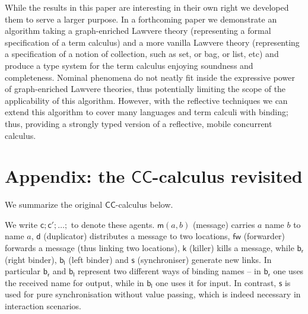 \documentclass[submission,copyright,creativecommons]{eptcs}
\newcommand{\new}{\mathsf{new}}
\newcommand{\ccomb}{$\mathsf{CC}$-calculus}
\newcommand{\bc}{\mathbin{\mathbf{::=}}}
\newcommand{\bm}{\mathbin{\mathbf\mid}}
\theoremstyle{definition}
\theoremstyle{remark}
\theoremstyle{remark}
\begin{document}
While the results in this paper are
interesting in their own right we developed them to serve a larger
purpose. In a forthcoming paper we demonstrate an algorithm taking a
graph-enriched Lawvere theory (representing a formal specification of
a term calculus) and a more vanilla Lawvere theory (representing a
specification of a notion of collection, such as set, or bag, or list,
etc) and produce a type system for the term calculus enjoying
soundness and completeness. Nominal phenomena do not neatly fit inside
the expressive power of graph-enriched Lawvere theories, thus
potentially limiting the scope of the applicability of this
algorithm. However, with the reflective techniques we can extend this
algorithm to cover many languages and term calculi with binding; thus,
providing a strongly typed version of a reflective, mobile concurrent
calculus.




\section{Appendix: the {\ccomb} revisited} \label{appendix:ccomb}
We summarize the original {\ccomb} \cite{DBLP:journals/tcs/Yoshida02} below.


We write $\mathsf{c};\mathsf{c'};\ldots;$ to denote these
agents. $\mathsf{m}(a,b)$ (message) carries $a$ name $b$ to name $a$,
$\mathsf{d}$ (duplicator) distributes a message to two locations,
$\mathsf{fw}$ (forwarder) forwards a message (thus linking two
locations), $\mathsf{k}$ (killer) kills a message, while
$\mathsf{b}_{\mathsf{r}}$ (right binder), $\mathsf{b}_{\mathsf{l}}$
(left binder) and $\mathsf{s}$ (synchroniser) generate new links. In
particular $\mathsf{b}_{\mathsf{r}}$ and $\mathsf{b}_{\mathsf{l}}$
represent two different ways of binding names – in
$\mathsf{b}_{\mathsf{r}}$ one uses the received name for output, while
in $\mathsf{b}_{\mathsf{l}}$ one uses it for input. In contrast,
$\mathsf{s}$ is used for pure synchronisation without value passing,
which is indeed necessary in interaction scenarios.
\end{document}
